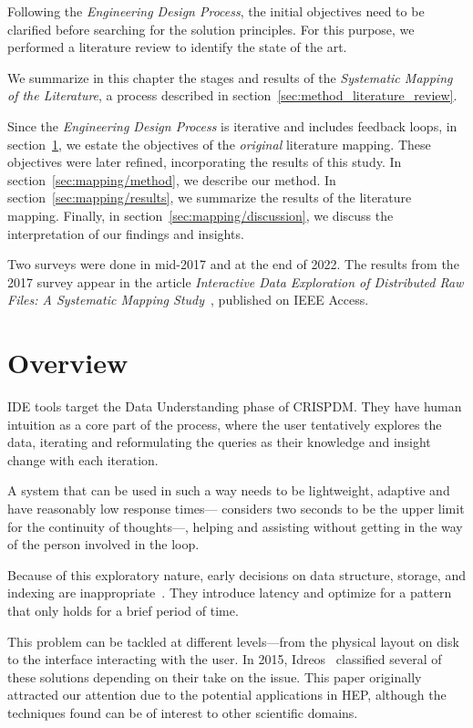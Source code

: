
Following the \emph{Engineering Design Process}, the initial objectives
need to be clarified before searching for the solution principles.
For this purpose, we performed a literature review to identify the
state of the art.

We summarize in this chapter the stages and results of the
\emph{Systematic Mapping of the Literature}, a process described in section~\ref{sec:method_literature_review}.

Since the \emph{Engineering Design Process} is iterative and includes feedback loops, in
section~\ref{sec:mapping/overview}, we estate the objectives of the
\emph{original} literature mapping. These objectives were later refined,
incorporating the results of this study.
In section~\ref{sec:mapping/method}, we describe our method.
In section~\ref{sec:mapping/results}, we summarize the results of the literature mapping.
Finally, in section~\ref{sec:mapping/discussion}, we discuss the interpretation of our findings
and insights.

Two surveys were done in mid-2017 and at the end of 2022. The results from the 2017 survey appear in the
article \emph{Interactive Data Exploration of Distributed Raw Files: A Systematic Mapping Study}~\cite{Alvarez2019},
published on IEEE Access.

\section{Overview}
\label{sec:mapping/overview}
\gls{IDE} tools target the Data Understanding phase of \gls{CRISPDM}. They have
human intuition as a core part of the process, where the user tentatively
explores the data, iterating and reformulating the queries as
their knowledge and insight change with each iteration.

A system that can be used in such a way needs to be lightweight, adaptive
and have reasonably low response times---\cite{Miller1968} considers two seconds
to be the upper limit for the continuity of thoughts---,
helping and assisting without getting in the way of the person involved in
the loop.

Because of this exploratory nature, early decisions on data structure,
storage, and indexing are inappropriate~\cite{Kersten2011}. They introduce latency
and optimize for a pattern that only holds for a brief period of time.

This problem can be tackled at different levels---from the physical layout on disk
to the interface interacting with the user. In 2015, Idreos~\cite{Idreos2015}
classified several of these solutions depending on their take
on the issue. This paper originally attracted our attention  due to the potential
applications in \gls{HEP}\footnotemark, although
the techniques found can be of interest to other scientific domains.

